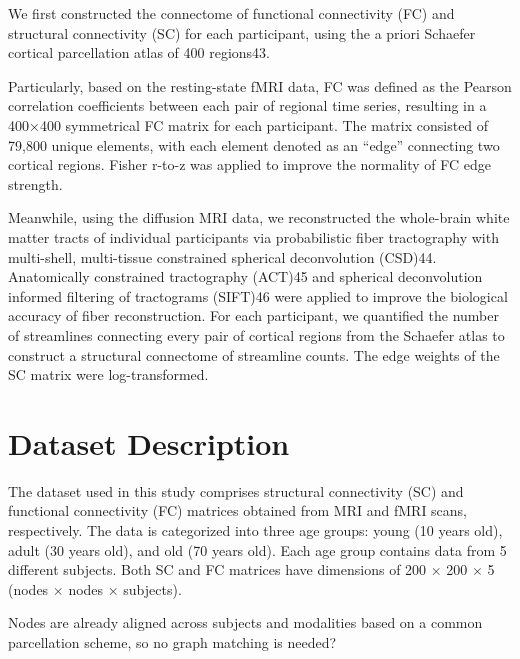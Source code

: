 We first constructed the connectome of functional connectivity (FC) 
and structural connectivity (SC) for each participant, using the a 
priori Schaefer cortical parcellation atlas of 400 regions43. 

Particularly, based on the resting-state fMRI data, FC was defined as 
the Pearson correlation coefficients between each pair of regional 
time series, resulting in a 400×400 symmetrical FC matrix for each 
participant. The matrix consisted of 79,800 unique elements, with 
each element denoted as an “edge” connecting two cortical regions. 
Fisher r-to-z was applied to improve the normality of FC edge strength. 

Meanwhile, using the diffusion MRI data, we reconstructed the whole-brain 
white matter tracts of individual participants via probabilistic fiber 
tractography with multi-shell, multi-tissue constrained spherical 
deconvolution (CSD)44. Anatomically constrained tractography (ACT)45 and 
spherical deconvolution informed filtering of tractograms (SIFT)46 were 
applied to improve the biological accuracy of fiber reconstruction. 
For each participant, we quantified the number of streamlines connecting 
every pair of cortical regions from the Schaefer atlas to construct a 
structural connectome of streamline counts. 
The edge weights of the SC matrix were log-transformed.
\cite{Chen2024}

\section{Dataset Description}
The dataset used in this study comprises structural connectivity (SC) and functional connectivity (FC) matrices 
obtained from MRI and fMRI scans, respectively. The data is categorized into three age groups: 
young (10 years old), adult (30 years old), and old (70 years old). Each age group contains data from 5 different subjects.
Both SC and FC matrices have dimensions of 200 $\times$ 200 $\times$ 5 (nodes $\times$ nodes $\times$ subjects).

Nodes are already aligned across subjects and modalities based on a 
common parcellation scheme, so no graph matching is needed? \cite{Puxeddu2022}
